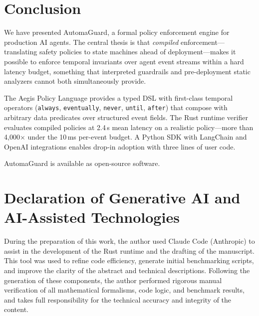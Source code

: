 \documentclass[sigconf]{acmart}
\begin{document}
\section{Conclusion}
\label{sec:conclusion}

We have presented AutomaGuard, a formal policy enforcement engine for production
AI agents. The central thesis is that \emph{compiled} enforcement---translating
safety policies to state machines ahead of deployment---makes it possible to
enforce temporal invariants over agent event streams within a hard latency budget,
something that interpreted guardrails and pre-deployment static analyzers cannot
both simultaneously provide.

The Aegis Policy Language provides a typed DSL with first-class temporal
operators (\texttt{always}, \texttt{eventually}, \texttt{never}, \texttt{until},
\texttt{after}) that compose with arbitrary data predicates over structured event
fields. The Rust runtime verifier evaluates compiled policies at 2.4\,\textmu s
mean latency on a realistic policy---more than 4,000$\times$ under the 10\,ms
per-event budget. A Python SDK with LangChain and OpenAI integrations enables
drop-in adoption with three lines of user code.

AutomaGuard is available as open-source software.

\begin{acks}
\end{acks}

\section*{Declaration of Generative AI and AI-Assisted Technologies}

During the preparation of this work, the author used Claude Code (Anthropic) to
assist in the development of the Rust runtime and the drafting of the manuscript.
This tool was used to refine code efficiency, generate initial benchmarking
scripts, and improve the clarity of the abstract and technical descriptions.
Following the generation of these components, the author performed rigorous manual
verification of all mathematical formalisms, code logic, and benchmark results,
and takes full responsibility for the technical accuracy and integrity of the
content.



\end{document}
